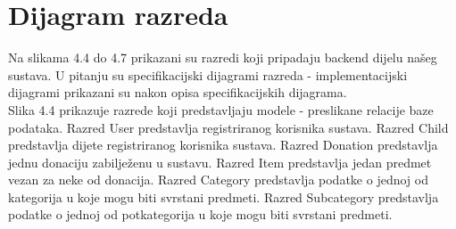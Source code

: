 			
		\section{Dijagram razreda}
			
			
			
			Na slikama 4.4 do 4.7 prikazani su razredi koji pripadaju backend dijelu našeg sustava. U pitanju su specifikacijski dijagrami razreda - implementacijski dijagrami prikazani su nakon opisa specifikacijskih dijagrama.\\[5pt]

			Slika 4.4 prikazuje razrede koji predstavljaju modele - preslikane relacije baze podataka. Razred User predstavlja registriranog korisnika sustava. Razred Child predstavlja dijete registriranog korisnika sustava. Razred Donation predstavlja jednu donaciju zabilježenu u sustavu. 
			Razred Item predstavlja jedan predmet vezan za neke od donacija. Razred Category predstavlja podatke o jednoj od kategorija u koje mogu biti svrstani predmeti. Razred Subcategory predstavlja podatke o jednoj od potkategorija u koje mogu biti svrstani predmeti.\\[10pt]

